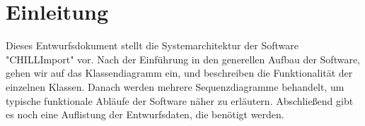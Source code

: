 \section{Einleitung}

Dieses Entwurfsdokument stellt die Systemarchitektur der Software \string"CHILLImport\string" vor.
Nach der Einführung in den generellen Aufbau der Software, gehen wir auf das Klassendiagramm ein, und beschreiben die Funktionalität der einzelnen Klassen.
Danach werden mehrere Sequenzdiagramme behandelt, um typische funktionale Abläufe der Software näher zu erläutern.
Abschließend gibt es noch eine Auflistung der Entwurfsdaten, die benötigt werden.
